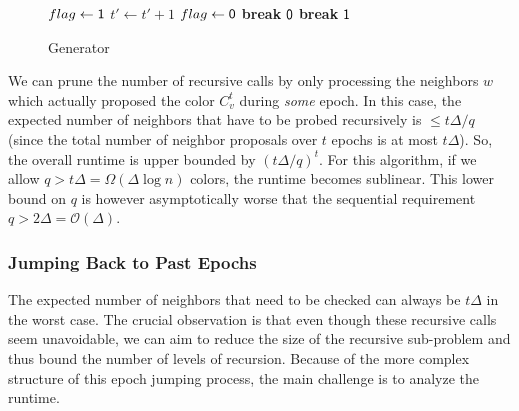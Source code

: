 \begin{wrapfigure}[19]{r}{0.48\textwidth}
\vspace{-1.5em}
\begin{framed}
    \renewcommand\figurename{Algorithm}
    \caption{Generator}
    \label{alg:coloring}
    \begin{algorithmic}[1]
                    \State {}
                \EndIf
                        \State $flag\gets \mathsf{1}$
                            \State $t'\gets t' + 1$
                                \State $flag\gets \mathsf{0}$
                                \State \textbf{break}
                            \EndIf
                        \EndWhile
                            \State \Return $\mathsf{0}$
                        \EndIf
                        \State \textbf{break}
                   \EndIf
                \EndFor
            \EndFor
            \State \Return $\mathsf{1}$
        \EndProcedure
    \end{algorithmic}
\end{framed}
\end{wrapfigure}

We can prune the number of recursive calls by only processing the neighbors $w$ which actually proposed the color $C^t_v$ during \emph{some} epoch.
In this case, the expected number of neighbors that have to be probed recursively is $\le t\Delta/q$
(since the total number of neighbor proposals over $t$ epochs is at most $t\Delta$).
So, the overall runtime is upper bounded by $(t\Delta/q)^{t}$.
For this algorithm, if we allow $q > t\Delta = \Omega(\Delta\log n)$ colors, the runtime becomes sublinear.
This lower bound on $q$ is however asymptotically worse that the sequential requirement $q > 2\Delta = \mathcal O(\Delta)$.


\subsubsection{Jumping Back to Past Epochs}
\label{sec:jumping_back_to_past_epochs}
The expected number of neighbors that need to be checked can always be $t\Delta$ in the worst case.
The crucial observation is that even though these recursive calls seem unavoidable,
we can aim to reduce the size of the recursive sub-problem and thus bound the number of levels of recursion.
Because of the more complex structure of this epoch jumping process, the main challenge is to analyze the runtime.

